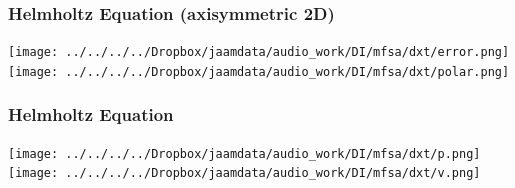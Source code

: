 
\begin{frame}
  \frametitle{Helmholtz Equation (axisymmetric 2D)\\
    }
  \begin{center}
    \texttt{[image: ../../../../Dropbox/jaamdata/audio\_work/DI/mfsa/dxt/error.png]}
    \texttt{[image: ../../../../Dropbox/jaamdata/audio\_work/DI/mfsa/dxt/polar.png]}

  \end{center}
\end{frame}


\begin{frame}
  \frametitle{Helmholtz Equation\\
    }
  \begin{center}
    \vskip -3mm
    \texttt{[image: ../../../../Dropbox/jaamdata/audio\_work/DI/mfsa/dxt/p.png]}
    \texttt{[image: ../../../../Dropbox/jaamdata/audio\_work/DI/mfsa/dxt/v.png]}
  \end{center}
\end{frame}
